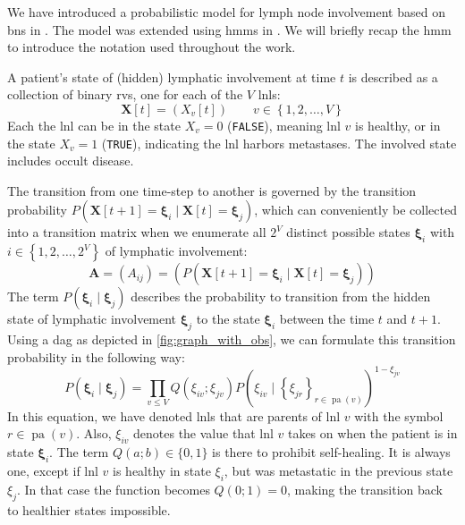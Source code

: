 \documentclass[twocolumn]{aastex631}
\begin{document}
We have introduced a probabilistic model for lymph node involvement based on \glspl{bn} in \cite{pouymayou_bayesian_2019}. The model was extended using \glspl{hmm} in \cite{ludwig_hidden_2021}. We will briefly recap the \acrlong{hmm} to introduce the notation used throughout the work.

A patient's state of (hidden) lymphatic involvement at time $t$ is described as a collection of binary \glspl{rv}, one for each of the $V$ \glspl{lnl}:
%
\begin{equation}
    \mathbf{X}[t] = \left( X_v[t] \right) \qquad v \in \left\{ 1,2, \ldots, V \right\}
\end{equation}
%
Each the \gls{lnl} can be in the state $X_v=0$ (\texttt{FALSE}), meaning \gls{lnl} $v$ is healthy, or in the state $X_v=1$ (\texttt{TRUE}), indicating the \gls{lnl} harbors metastases. The involved state includes occult disease.

The transition from one time-step to another is governed by the transition probability $P\left( \mathbf{X}[t+1]=\boldsymbol{\xi}_i \mid \mathbf{X}[t]=\boldsymbol{\xi}_j \right)$, which can conveniently be collected into a transition matrix when we enumerate all $2^V$ distinct possible states $\boldsymbol{\xi}_i$ with $i \in \left\{ 1,2, \ldots, 2^V \right\}$ of lymphatic involvement:
%
\begin{equation}
    \mathbf{A} = \left( A_{ij} \right) = \left( P\left( \mathbf{X}[t+1]=\boldsymbol{\xi}_i \mid \mathbf{X}[t]=\boldsymbol{\xi}_j \right) \right)
\end{equation}
%
The term $P\left( \boldsymbol{\xi}_i \mid \boldsymbol{\xi}_j \right)$ describes the probability to transition from the hidden state of lymphatic involvement $\boldsymbol{\xi}_j$ to the state $\boldsymbol{\xi}_i$ between the time $t$ and $t+1$. Using a \gls{dag} as depicted in \cref{fig:graph_with_obs}, we can formulate this transition probability in the following way:
%
\begin{equation}
    \label{eq:transition_prob}
    P\left( \boldsymbol{\xi}_i \mid \boldsymbol{\xi}_j \right) = \prod_{v \leq V} Q\left( \xi_{iv} ; \xi_{jv} \right) P \left( \xi_{iv} \mid \left\{ \xi_{jr} \right\}_{r \in \operatorname{pa}(v)} \right)^{1 - \xi_{jv}}
\end{equation}
%
In this equation, we have denoted \glspl{lnl} that are parents of \gls{lnl} $v$ with the symbol $r\in\operatorname{pa}(v)$. Also, $\xi_{iv}$ denotes the value that \gls{lnl} $v$ takes on when the patient is in state $\boldsymbol{\xi}_i$. The term $Q(a;b) \in \{ 0,1 \}$ is there to prohibit self-healing. It is always one, except if \gls{lnl} $v$ is healthy in state $\xi_i$, but was metastatic in the previous state $\xi_j$. In that case the function becomes $Q(0;1) = 0$, making the transition back to healthier states impossible.
\end{document}
